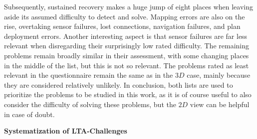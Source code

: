 \documentclass[english, master, utf8]{base/thesis_KBS}
\begin{document}
Subsequently, sustained recovery makes a huge jump of eight places when leaving aside its assumed difficulty to detect and solve.
Mapping errors are also on the rise, overtaking sensor failures, lost connections, navigation failures, and plan deployment errors.
Another interesting aspect is that sensor failures are far less relevant when disregarding their surprisingly low rated difficulty.
The remaining problems remain broadly similar in their assessment, with some changing places in the middle of the list, but this is not so relevant.
The problems rated as least relevant in the questionnaire remain the same as in the $3D$ case, mainly because they are considered relatively unlikely.
In conclusion, both lists are used to prioritize the problems to be studied in this work, as it is of course useful to also consider the difficulty of 
solving these problems, but the $2D$ view can be helpful in case of doubt.\newline

\noindent
\textbf{Systematization of LTA-Challenges}\newline
\end{document}
